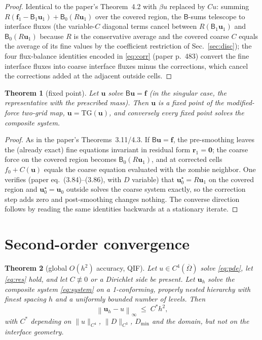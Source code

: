 \documentclass[11pt]{article}
\newtheorem{theorem}{Theorem}[section]
\theoremstyle{remark}
\newcommand{\norminf}[1]{\left\|#1\right\|_\infty}
\begin{document}
\begin{proof}
Identical to the paper's Theorem~4.2 with $\beta u$ replaced by $Cu$:
summing $R(\mathbf f_1-\mathsf B_1\mathbf u_1)+\mathsf B_0(R\mathbf u_1)$
over the covered region, the $\mathsf B$-sums telescope to interface
fluxes (the variable-$C$ diagonal terms cancel between
$R(\mathsf B_1\mathbf u_1)$ and $\mathsf B_0(R\mathbf u_1)$ because $R$
is the conservative average and the covered coarse $C$ equals the
average of its fine values by the coefficient restriction of
Sec.~\ref{sec:disc}); the four flux-balance identities encoded in
\eqref{eq:corr} (paper p.~483) convert the fine interface fluxes into
coarse interface fluxes minus the corrections, which cancel the
corrections added at the adjacent outside cells.
\end{proof}

\begin{theorem}[fixed point]\label{thm:fixed}
Let $\mathbf u$ solve $\mathsf B\mathbf u=\mathbf f$ (in the singular
case, the representative with the prescribed mass).  Then $\mathbf u$ is
a fixed point of the modified-force two-grid map,
$\mathbf u=\mathrm{TG}(\mathbf u)$, and conversely every fixed point
solves the composite system.
\end{theorem}

\begin{proof}
As in the paper's Theorems~3.11/4.3.  If $\mathsf B\mathbf u=\mathbf f$,
the pre-smoothing leaves the (already exact) fine equations invariant in
residual form $\mathbf r_1=\mathbf 0$; the coarse force on the covered
region becomes $\mathsf B_0(R\mathbf u_1)$, and at corrected cells
$f_0+C(\mathbf u)$ equals the coarse equation evaluated with the zombie
neighbor.  One verifies (paper eq.~(3.84)--(3.86), with $D$ variable)
that $\mathbf u_0^\star=R\mathbf u_1$ on the covered region and
$\mathbf u_0^\star=\mathbf u_0$ outside solves the coarse system
exactly, so the correction step adds zero and post-smoothing changes
nothing.  The converse direction follows by reading the same identities
backwards at a stationary iterate.
\end{proof}

\section{Second-order convergence}\label{sec:acc}

\begin{theorem}[global $O(h^2)$ accuracy, QIF]\label{thm:acc}
Let $u\in C^4(\overline\Omega)$ solve \eqref{eq:pde}, let
\eqref{eq:res} hold, and let $C\not\equiv0$ or a Dirichlet side be
present.  Let $\mathbf u_h$ solve the composite system
\eqref{eq:system} on a 1-conforming, properly nested hierarchy with
finest spacing $h$ and a uniformly bounded number of levels.  Then
\[
  \norminf{\mathbf u_h - u} \;\le\; C^\ast h^2 ,
\]
with $C^\ast$ depending on $\|u\|_{C^4}$, $\|D\|_{C^3}$, $D_{\min}$ and
the domain, but not on the interface geometry.
\end{theorem}
\end{document}
